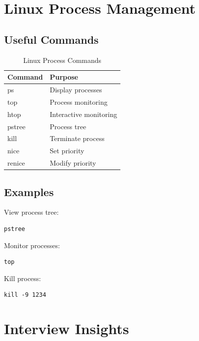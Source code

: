 \section{Linux Process Management}

\subsection{Useful Commands}

\begin{table}[H]
\centering
\begin{tabular}{|p{4cm}|p{8cm}|}
\hline
Command & Purpose \\
\hline
ps & Display processes \\
\hline
top & Process monitoring \\
\hline
htop & Interactive monitoring \\
\hline
pstree & Process tree \\
\hline
kill & Terminate process \\
\hline
nice & Set priority \\
\hline
renice & Modify priority \\
\hline
\end{tabular}
\caption{Linux Process Commands}
\end{table}

\subsection{Examples}

View process tree:

\begin{verbatim}
pstree
\end{verbatim}

Monitor processes:

\begin{verbatim}
top
\end{verbatim}

Kill process:

\begin{verbatim}
kill -9 1234
\end{verbatim}

\section{Interview Insights}

